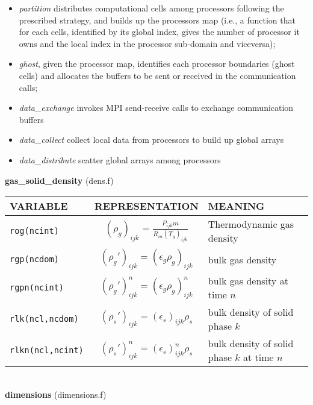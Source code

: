 \begin{itemize}
\item{\em partition} distributes computational cells among processors following the 
prescribed strategy, and builds up the processors map (i.e., a function that
 for each cells, identified by its global index, gives the number of 
processor it owns and the local index in the processor sub-domain and viceversa);
\item{\em ghost}, given the processor map, identifies each processor boundaries 
(ghost cells) and
allocates the buffers to be sent or received in the communication calls;\\
\item{\em data\_exchange} invokes MPI send-receive calls to exchange communication 
 buffers
\item{\em data\_collect} collect local data from processors to build up global arrays
\item{\em data\_distribute} scatter global arrays among processors
\end{itemize}
%
%
{\large {\bf gas\_solid\_density}} (dens.f)\\[5mm]
\begin{tabular}{|p{6cm}|c|p{6cm}|}\hline
VARIABLE & REPRESENTATION & MEANING\\\hline
\tt rog(ncint) & $(\rho_g)_{ijk}=\frac{P_{ijk}m}{R_m(T_g)_{ijk}}$ &  Thermodynamic gas density \\\hline
\tt rgp(ncdom) & $(\rho_g')_{ijk}=(\epsilon_g\rho_g)_{ijk} $&  bulk gas density \\\hline
\tt rgpn(ncint) & $(\rho_g')^{n}_{ijk}=(\epsilon_g\rho_g)^{n}_{ijk} $&  bulk gas density at time $n$ \\\hline
\tt rlk(ncl,ncdom) & $(\rho_s')_{ijk}=(\epsilon_s)_{ijk}\rho_s$ &  bulk density of solid phase $k$ \\\hline
\tt rlkn(ncl,ncint) & $(\rho_s')^{n}_{ijk}=(\epsilon_s)^{n}_{ijk}\rho_s$ &  bulk density of solid phase $k$ at time $n$\\\hline
\end{tabular}\\[5mm]
%
%
{\large {\bf dimensions}} (dimensions.f)\\[5mm]

